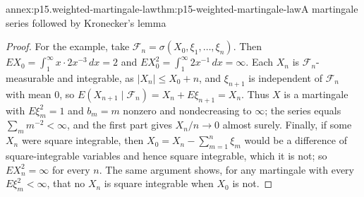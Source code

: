 \begin{annexitem}{annex:p15.weighted-martingale-law}{thm:p15-weighted-martingale-law}{A martingale series followed by Kronecker's lemma}
\begin{proof}
For the example, take
\(\mathcal F_n=\sigma(X_0,\xi_1,\ldots,\xi_n)\). Then
\(EX_0=\int_1^\infty x\cdot2x^{-3}\,dx=2\) and
\(EX_0^2=\int_1^\infty2x^{-1}\,dx=\infty\). Each \(X_n\) is
\(\mathcal F_n\)-measurable and integrable, as
\(|X_n|\leq X_0+n\), and \(\xi_{n+1}\) is independent of
\(\mathcal F_n\) with mean \(0\), so
\(E(X_{n+1}\mid\mathcal F_n)=X_n+E\xi_{n+1}=X_n\). Thus \(X\) is a
martingale with \(E\xi_m^2=1\) and \(b_m=m\) nonzero and nondecreasing
to \(\infty\); the series equals \(\sum_mm^{-2}<\infty\), and the first
part gives \(X_n/n\to0\) almost surely. Finally, if some \(X_n\) were
square integrable, then \(X_0=X_n-\sum_{m=1}^n\xi_m\) would be a
difference of square-integrable variables and hence square integrable,
which it is not; so \(EX_n^2=\infty\) for every \(n\). The same argument
shows, for any martingale with every \(E\xi_m^2<\infty\), that no
\(X_n\) is square integrable when \(X_0\) is not.
\end{proof}
\end{annexitem}

